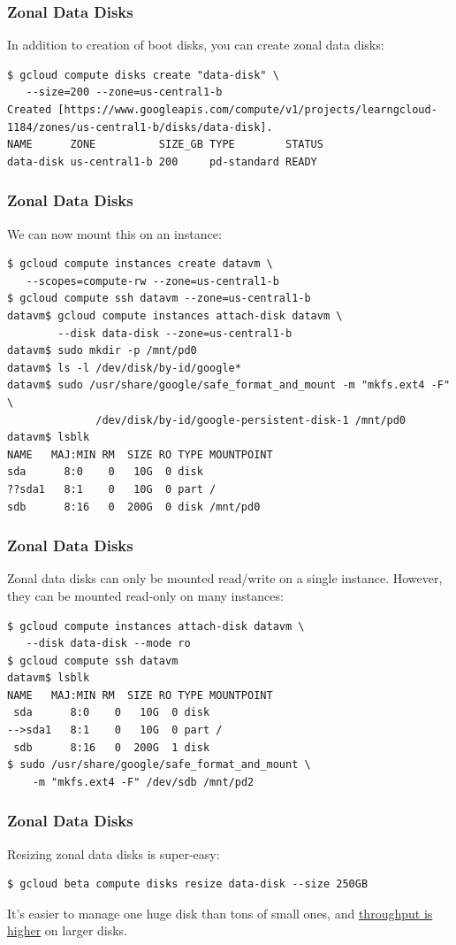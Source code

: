 \documentclass[9pt]{beamer}
\begin{document}
\begin{frame}[fragile]
\frametitle{Zonal Data Disks}
In addition to creation of boot disks, you can create zonal data disks:
\begin{verbatim}
$ gcloud compute disks create "data-disk" \
   --size=200 --zone=us-central1-b
Created [https://www.googleapis.com/compute/v1/projects/learngcloud-1184/zones/us-central1-b/disks/data-disk].
NAME      ZONE          SIZE_GB TYPE        STATUS
data-disk us-central1-b 200     pd-standard READY
\end{verbatim}
\end{frame}

\begin{frame}[fragile]
\frametitle{Zonal Data Disks}
We can now mount this on an instance:
\begin{verbatim}
$ gcloud compute instances create datavm \
   --scopes=compute-rw --zone=us-central1-b
$ gcloud compute ssh datavm --zone=us-central1-b
datavm$ gcloud compute instances attach-disk datavm \
        --disk data-disk --zone=us-central1-b
datavm$ sudo mkdir -p /mnt/pd0
datavm$ ls -l /dev/disk/by-id/google*	
datavm$ sudo /usr/share/google/safe_format_and_mount -m "mkfs.ext4 -F" \
              /dev/disk/by-id/google-persistent-disk-1 /mnt/pd0
datavm$ lsblk
NAME   MAJ:MIN RM  SIZE RO TYPE MOUNTPOINT
sda      8:0    0   10G  0 disk
??sda1   8:1    0   10G  0 part /
sdb      8:16   0  200G  0 disk /mnt/pd0
\end{verbatim}
\end{frame}

\begin{frame}[fragile]
\frametitle{Zonal Data Disks}
Zonal data disks can only be mounted read/write on a single instance. However, they can be mounted read-only on many instances:
\begin{verbatim}
$ gcloud compute instances attach-disk datavm \
   --disk data-disk --mode ro
$ gcloud compute ssh datavm
datavm$ lsblk
NAME   MAJ:MIN RM  SIZE RO TYPE MOUNTPOINT
 sda      8:0    0   10G  0 disk
-->sda1   8:1    0   10G  0 part /
 sdb      8:16   0  200G  1 disk
$ sudo /usr/share/google/safe_format_and_mount \
    -m "mkfs.ext4 -F" /dev/sdb /mnt/pd2
\end{verbatim}
\end{frame}

\begin{frame}[fragile]
\frametitle{Zonal Data Disks}
Resizing zonal data disks is super-easy:
\begin{verbatim}
$ gcloud beta compute disks resize data-disk --size 250GB
\end{verbatim}
It's easier to manage one huge disk than tons of small ones, and \href{https://cloud.google.com/compute/docs/disks/persistent-disks}{throughput is higher} on larger disks.
\end{frame}
\end{document}
